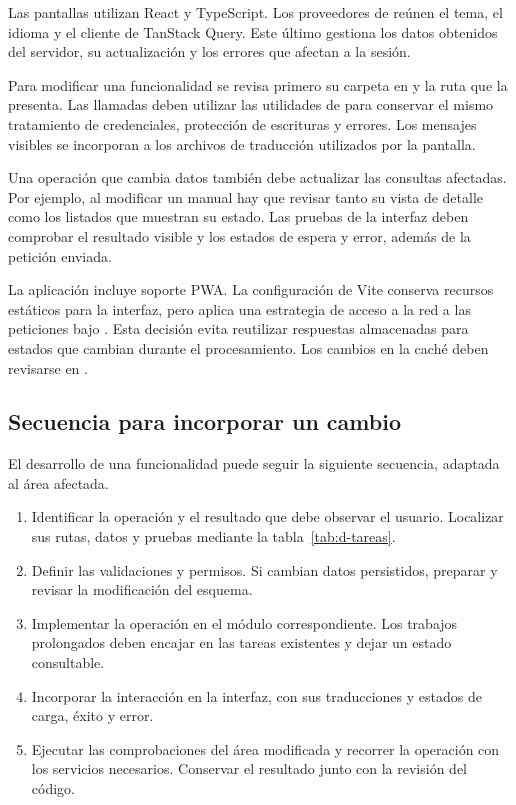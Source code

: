 Las pantallas utilizan React y TypeScript. Los proveedores de  reúnen el tema, el idioma y el cliente de TanStack Query. Este último gestiona los datos obtenidos del servidor, su actualización y los errores que afectan a la sesión.

Para modificar una funcionalidad se revisa primero su carpeta en  y la ruta que la presenta. Las llamadas deben utilizar las utilidades de  para conservar el mismo tratamiento de credenciales, protección de escrituras y errores. Los mensajes visibles se incorporan a los archivos de traducción utilizados por la pantalla.

Una operación que cambia datos también debe actualizar las consultas afectadas. Por ejemplo, al modificar un manual hay que revisar tanto su vista de detalle como los listados que muestran su estado. Las pruebas de la interfaz deben comprobar el resultado visible y los estados de espera y error, además de la petición enviada.

La aplicación incluye soporte \ac{PWA}. La configuración de Vite conserva recursos estáticos para la interfaz, pero aplica una estrategia de acceso a la red a las peticiones bajo . Esta decisión evita reutilizar respuestas almacenadas para estados que cambian durante el procesamiento. Los cambios en la caché deben revisarse en .

\subsection{Secuencia para incorporar un cambio}

El desarrollo de una funcionalidad puede seguir la siguiente secuencia, adaptada al área afectada.

\begin{enumerate}
  \item Identificar la operación y el resultado que debe observar el usuario. Localizar sus rutas, datos y pruebas mediante la tabla~\ref{tab:d-tareas}.
  \item Definir las validaciones y permisos. Si cambian datos persistidos, preparar y revisar la modificación del esquema.
  \item Implementar la operación en el módulo correspondiente. Los trabajos prolongados deben encajar en las tareas existentes y dejar un estado consultable.
  \item Incorporar la interacción en la interfaz, con sus traducciones y estados de carga, éxito y error.
  \item Ejecutar las comprobaciones del área modificada y recorrer la operación con los servicios necesarios. Conservar el resultado junto con la revisión del código.
\end{enumerate}

